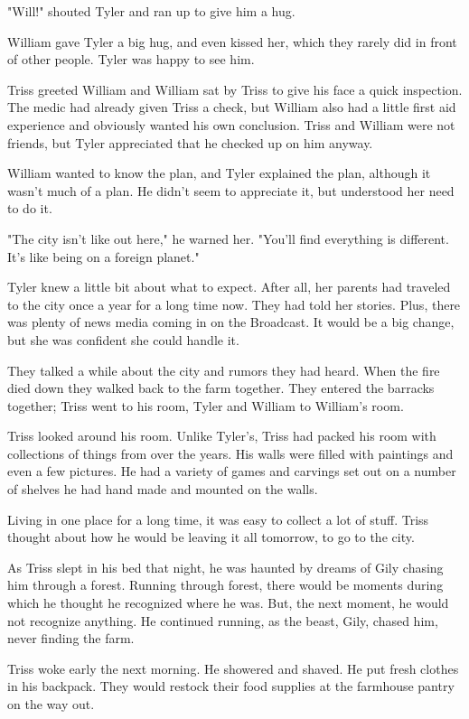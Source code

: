 \documentclass[courier]{sffms}
\begin{document}
"Will!" shouted Tyler and ran up to give him a
hug.

William gave Tyler a big hug, and even kissed her,
which they rarely did in front of other people.
Tyler was happy to see him.

Triss greeted William and William sat by Triss
to give his face a quick inspection. The medic
had already given Triss a check, but William
also had a little first aid experience and obviously
wanted his own conclusion. Triss and William
were not friends, but Tyler appreciated that he
checked up on him anyway.

William wanted to know the plan, and Tyler
explained the plan, although it wasn't much of
a plan. He didn't seem to appreciate it, but
understood her need to do it.

"The city isn't like out here," he warned her.
"You'll find everything is different. It's like 
being on a foreign planet."

Tyler knew a little bit about what to expect.
After all, her parents had traveled to the city
once a year for a long time now. They had
told her stories. Plus, there was plenty of
news media coming in on the Broadcast. It
would be a big change, but she was confident
she could handle it.

They talked a while about the city and rumors
they had heard. When the fire died down they
walked back to the farm together. They entered
the barracks together; Triss went to his room,
Tyler and William to William's room.

Triss looked around his room. Unlike Tyler's,
Triss had packed his room with collections
of things from over the years. His walls were
filled with paintings and even a few pictures.
He had a variety of games and carvings set
out on a number of shelves he had hand made
and mounted on the walls.

Living in one place for a long time, it was easy
to collect a lot of stuff. Triss thought about how
he would be leaving it all tomorrow, to go to the
city.

As Triss slept in his bed that night, he was
haunted by dreams of Gily chasing him through
a forest. Running through forest, there would be
moments during which he thought he recognized
where he was. But, the next moment, he would
not recognize anything. He continued running,
as the beast, Gily, chased him, never finding
the farm.

Triss woke early the next morning. He showered
and shaved. He put fresh clothes in his backpack.
They would restock their food supplies at the
farmhouse pantry on the way out.
\end{document}
